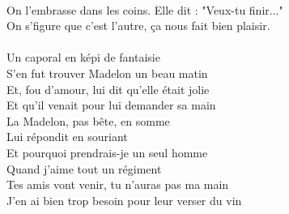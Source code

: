 \\On l'embrasse dans les coins. Elle dit : "Veux-tu finir..."
\\On s'figure que c'est l'autre, ça nous fait bien plaisir.
\\\\Un caporal en képi de fantaisie
\\S'en fut trouver Madelon un beau matin
\\Et, fou d'amour, lui dit qu'elle était jolie
\\Et qu'il venait pour lui demander sa main
\\La Madelon, pas bête, en somme
\\Lui répondit en souriant
\\Et pourquoi prendrais-je un seul homme
\\Quand j'aime tout un régiment
\\Tes amis vont venir, tu n'auras pas ma main
\\J'en ai bien trop besoin pour leur verser du vin


\breakpage